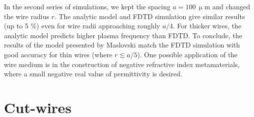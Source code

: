 {In the second series of simulations, we kept the spacing $a = 100\,\upmu$m and changed the wire radius $r$. The analytic model\cite{maslovski2002wire} and FDTD simulation give similar results (up to 5 \%) even for wire radii approaching roughly $a/4$. For thicker wires, the analytic model predicts higher plasma frequency than FDTD.  To conclude, the results of the model presented by Maslovski match the FDTD simulation with good accuracy for thin wires (where $r \lesssim a/5$). One possible application of the wire medium is in the construction of negative refractive index metamaterials, where a small negative real value of permittivity is desired.
}
	




\FloatBarrier
\section{Cut-wires} \label{section_cutwires} %

